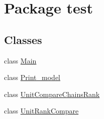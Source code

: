 \hypertarget{namespacetest}{}\section{Package test}
\label{namespacetest}
\subsection*{Classes}
\begin{DoxyCompactItemize}
\item 
class \hyperlink{classtest_1_1_main}{Main}
\item 
class \hyperlink{classtest_1_1_print__model}{Print\+\_\+model}
\item 
class \hyperlink{classtest_1_1_unit_compare_chains_rank}{Unit\+Compare\+Chains\+Rank}
\item 
class \hyperlink{classtest_1_1_unit_rank_compare}{Unit\+Rank\+Compare}
\end{DoxyCompactItemize}
